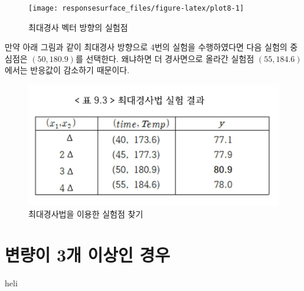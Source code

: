 \documentclass[
]{book}
\newenvironment{Shaded}{\begin{snugshade}}{\end{snugshade}}
\newcommand{\NormalTok}[1]{#1}
\theoremstyle{definition}
\theoremstyle{definition}
\theoremstyle{definition}
\theoremstyle{definition}
\theoremstyle{remark}
\begin{document}
\begin{figure}

{\centering \texttt{[image: responsesurface\_files/figure-latex/plot8-1]} 

}

\caption{최대경사 벡터 방향의 실험점}\label{fig:plot8}
\end{figure}

만약 아래 그림과 같이 최대경사 방향으로 4번의 실험을 수행하였다면 다음 실험의 중심점은 \((50, 180.9)\)를 선택한다. 왜냐하면 더 경사면으로 올라간 실험점 \((55, 184.6)\) 에서는 반응값이 감소하기 때문이다.

\begin{figure}

{\centering \includegraphics[width=0.7\linewidth]{myimages/response-05} 

}

\caption{최대경사법을 이용한 실험점 찾기}\label{fig:unnamed-chunk-13}
\end{figure}

\hypertarget{uxbcc0uxb7c9uxc774-3uxac1c-uxc774uxc0c1uxc778-uxacbduxc6b0}{%
\section{변량이 3개 이상인 경우}\label{uxbcc0uxb7c9uxc774-3uxac1c-uxc774uxc0c1uxc778-uxacbduxc6b0}}

\begin{Shaded}
\begin{Highlighting}[]
\NormalTok{heli}
\end{Highlighting}
\end{Shaded}
\end{document}
